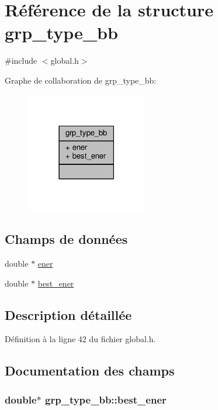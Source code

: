 \hypertarget{structgrp__type__bb}{\section{Référence de la structure grp\+\_\+type\+\_\+bb}
\label{structgrp__type__bb}
}


{\ttfamily \#include $<$global.\+h$>$}



Graphe de collaboration de grp\+\_\+type\+\_\+bb\+:\nopagebreak
\begin{figure}[H]
\begin{center}
\leavevmode
\includegraphics[width=150pt]{structgrp__type__bb__coll__graph}
\end{center}
\end{figure}
\subsection*{Champs de données}
\begin{DoxyCompactItemize}
\item 
double $\ast$ \hyperlink{structgrp__type__bb_a70906fe692863912bbdcd3b06de49bfd}{ener}
\item 
double $\ast$ \hyperlink{structgrp__type__bb_abb9cc7ec78adad28a0a7a8d76c374a0b}{best\+\_\+ener}
\end{DoxyCompactItemize}


\subsection{Description détaillée}


Définition à la ligne 42 du fichier global.\+h.



\subsection{Documentation des champs}
\hypertarget{structgrp__type__bb_abb9cc7ec78adad28a0a7a8d76c374a0b}{
\subsubsection[{best\+\_\+ener}]{\setlength{\rightskip}{0pt plus 5cm}double$\ast$ grp\+\_\+type\+\_\+bb\+::best\+\_\+ener}}\label{structgrp__type__bb_abb9cc7ec78adad28a0a7a8d76c374a0b}


